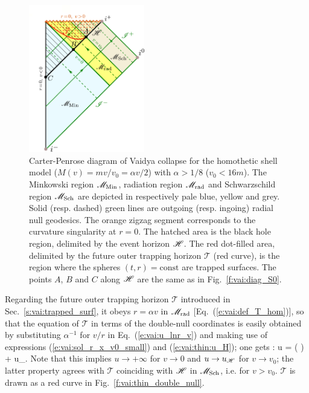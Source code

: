 \begin{figure}
\centerline{\includegraphics[width=0.45\textwidth]{vai_CPdiag_thin.pdf}}
\caption[]{\label{f:vai:CPdiag_thin} \footnotesize
Carter-Penrose diagram of Vaidya collapse
for the homothetic shell model ($M(v) = m v/v_0 = \alpha v /2$) with
$\alpha > 1/8$ ($v_0 < 16m$).
The Minkowski region $\mathscr{M}_{\rm Min}$, radiation region $\mathscr{M}_{\rm rad}$
and Schwarzschild region $\mathscr{M}_{\rm Sch}$ are depicted in respectively
pale blue, yellow and grey.
Solid (resp. dashed) green lines are outgoing (resp. ingoing)
radial null geodesics.
The orange zigzag segment corresponds to the curvature
singularity at $r=0$. The hatched area is the black hole region,
delimited by the event horizon $\mathscr{H}$.
The red dot-filled area, delimited by the future outer trapping horizon
$\mathscr{T}$ (red curve),
is the region where the spheres $(t,r)=\mathrm{const}$
are trapped surfaces.
The points $A$, $B$ and $C$ along $\mathscr{H}$ are the same as in Fig.~\ref{f:vai:diag_S0}.
}
\end{figure}

Regarding the future outer trapping horizon $\mathscr{T}$ introduced in
Sec.~\ref{s:vai:trapped_surf}, it obeys $r=\alpha v$ in $\mathscr{M}_{\rm rad}$
[Eq.~(\ref{e:vai:def_T_hom})],
so that the equation
of $\mathscr{T}$ in terms of the double-null coordinates is easily obtained
by substituting $\alpha^{-1}$ for $v/r$ in Eq.~(\ref{e:vai:u_lnr_v})
and making use of expressions (\ref{e:vai:sol_r_x_v0_small}) and (\ref{e:vai:thin:u_H}); one gets
\be \label{e:vai:thin:trap_uv}
  : \qquad  u = \ln\left(  \right) + u_\Hor .
\ee
Note that this implies $u\to +\infty$ for $v\to 0$ and $u\to u_{\mathscr{H}}$
for $v\to v_0$; the latter property agrees with $\mathscr{T}$ coinciding
with $\mathscr{H}$ in $\mathscr{M}_{\rm Sch}$, i.e. for $v > v_0$.
$\mathscr{T}$ is drawn as a red curve in Fig.~\ref{f:vai:thin_double_null}.

